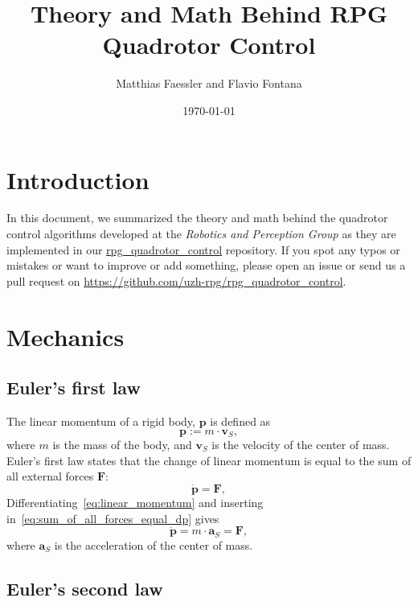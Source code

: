 \documentclass[10pt,a4paper,fleqn]{article}
\title{Theory and Math Behind RPG Quadrotor Control}
\author{
  Matthias Faessler and Flavio Fontana
}
\date{\today}
\newcommand{\bVec}[1]{\mathbf{#1}}
\begin{document}
\pagestyle{fancy}             %

\maketitle
\tableofcontents
\newpage


\section{Introduction}

In this document, we summarized the theory and math behind the quadrotor control algorithms developed at the \emph{Robotics and Perception Group} as they are implemented in our \href{https://github.com/uzh-rpg/rpg_quadrotor_control}{rpg\_quadrotor\_control} repository.
If you spot any typos or mistakes or want to improve or add something, please open an issue or send us a pull request on \url{https://github.com/uzh-rpg/rpg_quadrotor_control}.

\section{Mechanics}

\subsection{Euler's first law}

The linear momentum of a rigid body, $\bVec{p}$ is defined as 
%
\begin{equation}
	 \bVec{p} := m\cdot   \bVec{v}_S,
	 \label{eq:linear_momentum}
\end{equation}
%
where $m$ is the mass of the body, and $\bVec{v}_S$ is the velocity of the center of mass.
Euler's first law states that the change of linear momentum is equal to the sum of all external forces $\bVec{F}$:
%
\begin{equation}
	\dot{\bVec{p}} =   \bVec{F},
	\label{eq:sum_of_all_forces_equal_dp}
\end{equation}
%
Differentiating~\eqref{eq:linear_momentum} and inserting in~\eqref{eq:sum_of_all_forces_equal_dp} gives
%
\begin{equation}
	\dot{\bVec{p}} = m \cdot   \bVec{a}_S =   \bVec{F},
	\label{eq:pdot_equal_F}
\end{equation}
%
where $\bVec{a}_S$ is the acceleration of the center of mass.	

\subsection{Euler's second law}	
\end{document}
